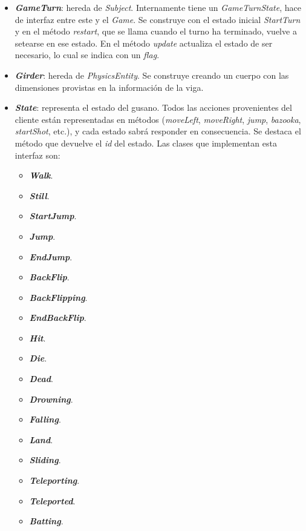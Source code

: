 \begin{itemize}
	\item \textbf{\textit{GameTurn}}: hereda de \textit{Subject}. Internamente tiene un \textit{GameTurnState}, hace de interfaz entre este y el \textit{Game}. Se construye con el estado inicial \textit{StartTurn} y en el método \textit{restart}, que se llama cuando el turno ha terminado, vuelve a setearse en ese estado. En el método \textit{update} actualiza el estado de ser necesario, lo cual se indica con un \textit{flag}.
	
	\item \textbf{\textit{Girder}}: hereda de \textit{PhysicsEntity}. Se construye creando un cuerpo con las dimensiones provistas en la información de la viga.
	
	\item \textbf{\textit{State}}: representa el estado del gusano. Todos las acciones provenientes del cliente están representadas en métodos (\textit{moveLeft}, \textit{moveRight}, \textit{jump}, \textit{bazooka}, \textit{startShot}, etc.), y cada estado sabrá responder en consecuencia. Se destaca el método que devuelve el \textit{id} del estado. Las clases que implementan esta interfaz son:
	\begin{itemize}
		\item \textbf{\textit{Walk}}.
		\item \textbf{\textit{Still}}.
		\item \textbf{\textit{StartJump}}.
		\item \textbf{\textit{Jump}}.
		\item \textbf{\textit{EndJump}}.
		\item \textbf{\textit{BackFlip}}.
		\item \textbf{\textit{BackFlipping}}.
		\item \textbf{\textit{EndBackFlip}}.
		\item \textbf{\textit{Hit}}.
		\item \textbf{\textit{Die}}.
		\item \textbf{\textit{Dead}}.
		\item \textbf{\textit{Drowning}}.
		\item \textbf{\textit{Falling}}.
		\item \textbf{\textit{Land}}.
		\item \textbf{\textit{Sliding}}.
		\item \textbf{\textit{Teleporting}}.
		\item \textbf{\textit{Teleported}}.
		\item \textbf{\textit{Batting}}.
	\end{itemize}
	

\end{itemize}
